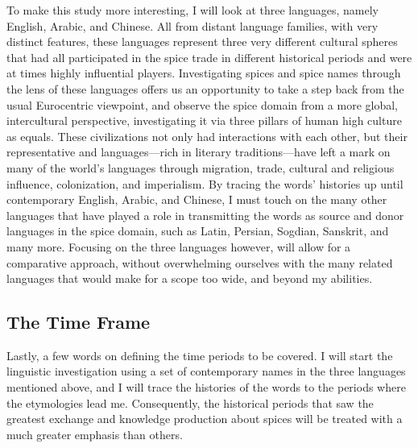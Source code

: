 To make this study more interesting, I will look at three languages, namely English, Arabic, and Chinese. All from distant language families, with very distinct features, these languages represent three very different cultural spheres that had all participated in the spice trade in different historical periods and were at times highly influential players. Investigating spices and spice names through the lens of these languages offers us an opportunity to take a step back from the usual Eurocentric viewpoint, and observe the spice domain from a more global, intercultural perspective, investigating it via three pillars of human high culture as equals. These civilizations not only had interactions with each other, but their representative and languages---rich in literary traditions---have left a mark on many of the world's languages through migration, trade, cultural and religious influence, colonization, and imperialism. By tracing the words' histories up until contemporary English, Arabic, and Chinese, I must touch on the many other languages that have played a role in transmitting the words as source and donor languages in the spice domain, such as Latin, Persian, Sogdian, Sanskrit, and many more. Focusing on the three languages however, will allow for a comparative approach, without overwhelming ourselves with the many related languages that would make for a scope too wide, and beyond my abilities.


\subsection{The Time Frame}

Lastly, a few words on defining the time periods to be covered. I will start the linguistic investigation using a set of contemporary names in the three languages mentioned above, and I will trace the histories of the words to the periods where the etymologies lead me. Consequently, the historical periods that saw the greatest exchange and knowledge production about spices will be treated with a much greater emphasis than others.


